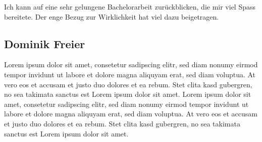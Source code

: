 Ich kann auf eine sehr gelungene Bachelorarbeit zurückblicken, die mir viel Spass bereitete. Der enge Bezug zur Wirklichkeit hat viel dazu beigetragen.

\pagebreak

\subsection*{Dominik Freier}
\tbd
Lorem ipsum dolor sit amet, consetetur sadipscing elitr, sed diam nonumy eirmod tempor invidunt ut labore et dolore magna aliquyam erat, sed diam voluptua. At vero eos et accusam et justo duo dolores et ea rebum. Stet clita kasd gubergren, no sea takimata sanctus est Lorem ipsum dolor sit amet. Lorem ipsum dolor sit amet, consetetur sadipscing elitr, sed diam nonumy eirmod tempor invidunt ut labore et dolore magna aliquyam erat, sed diam voluptua. At vero eos et accusam et justo duo dolores et ea rebum. Stet clita kasd gubergren, no sea takimata sanctus est Lorem ipsum dolor sit amet.